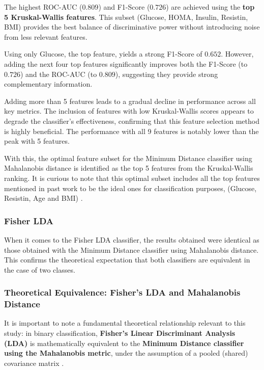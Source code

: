 \documentclass[12pt,a4paper]{article}
\begin{document}
The highest ROC-AUC ($0.809$) and F1-Score ($0.726$) are achieved using the \textbf{top 5 Kruskal-Wallis features}. This subset (Glucose, HOMA, Insulin, Resistin, BMI) provides the best balance of discriminative power without introducing noise from less relevant features.

Using only Glucose, the top feature, yields a strong F1-Score of $0.652$. However, adding the next four top features significantly improves both the F1-Score (to $0.726$) and the ROC-AUC (to $0.809$), suggesting they provide strong complementary information.

Adding more than 5 features leads to a gradual decline in performance across all key metrics. The inclusion of features with low Kruskal-Wallis scores appears to degrade the classifier's effectiveness, confirming that this feature selection method is highly beneficial. The performance with all 9 features is notably lower than the peak with 5 features.



With this, the optimal feature subset for the Minimum Distance classifier using Mahalanobis distance is identified as the top 5 features from the Kruskal-Wallis ranking. It is curious to note that this optimal subset includes all the top features mentioned in past work to be the ideal ones for classification purposes, (Glucose, Resistin, Age and BMI) \cite{patricio2018using}.


\subsubsection{Fisher LDA}
When it comes to the Fisher LDA classifier, the results obtained were identical as those obtained with the Minimum Distance classifier using Mahalanobis distance. This confirms the theoretical expectation that both classifiers are equivalent in the case of two classes. 
\subsubsection*{Theoretical Equivalence: Fisher's LDA and Mahalanobis Distance}

It is important to note a fundamental theoretical relationship relevant to this study: in binary classification, \textbf{Fisher's Linear Discriminant Analysis (LDA)} is mathematically equivalent to the \textbf{Minimum Distance classifier using the Mahalanobis metric}, under the assumption of a pooled (shared) covariance matrix \cite{tharwat2017linear}.
\end{document}
